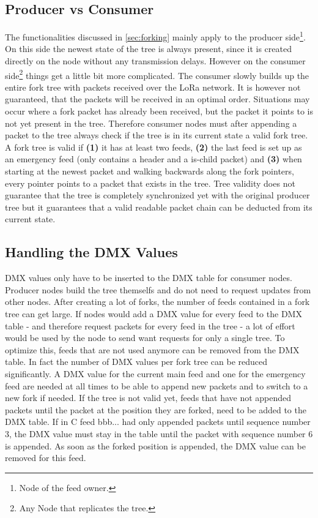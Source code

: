 \subsection{Producer vs Consumer}
The functionalities discussed in \cref{sec:forking} mainly apply to the producer side\footnote{Node of the feed owner.}. On this side the newest state of the tree is always present, since it is created directly on the node without any transmission delays. However on the consumer side\footnote{Any Node that replicates the tree.} things get a little bit more complicated. The consumer slowly builds up the entire fork tree with packets received over the LoRa network. It is however not guaranteed, that the packets will be received in an optimal order. Situations may occur where a fork packet has already been received, but the packet it points to is not yet present in the tree. Therefore consumer nodes must after appending a packet to the tree always check if the tree is in its current state a valid fork tree. A fork tree is valid if \textbf{(1)} it has at least two feeds, \textbf{(2)} the last feed is set up as an emergency feed (only contains a header and a is-child packet) and \textbf{(3)} when starting at the newest packet and walking backwards along the fork pointers, every pointer points to a packet that exists in the tree. Tree validity does not guarantee that the tree is completely synchronized yet with the original producer tree but it guarantees that a valid readable packet chain can be deducted from its current state.

\subsection{Handling the DMX Values}
\label{sec:dmxfork}
DMX values only have to be inserted to the DMX table for consumer nodes. Producer nodes build the tree themselfs and do not need to request updates from other nodes.
After creating a lot of forks, the number of feeds contained in a fork tree can get large. If nodes would add a DMX value for every feed to the DMX table - and therefore request packets for every feed in the tree - a lot of effort would be used by the node to send want requests for only a single tree. To optimize this, feeds that are not used anymore can be removed from the DMX table. In fact the number of DMX values per fork tree can be reduced significantly. A DMX value for the current main feed and one for the emergency feed are needed at all times to be able to append new packets and to switch to a new fork if needed. If the tree is not valid yet, feeds that have not appended packets until the packet at the position they are forked, need to be added to the DMX table. If in \cite{fig:fork3} C feed bbb... had only appended packets until sequence number 3, the DMX value must stay in the table until the packet with sequence number 6 is appended. As soon as the forked position is appended, the DMX value can be removed for this feed.


